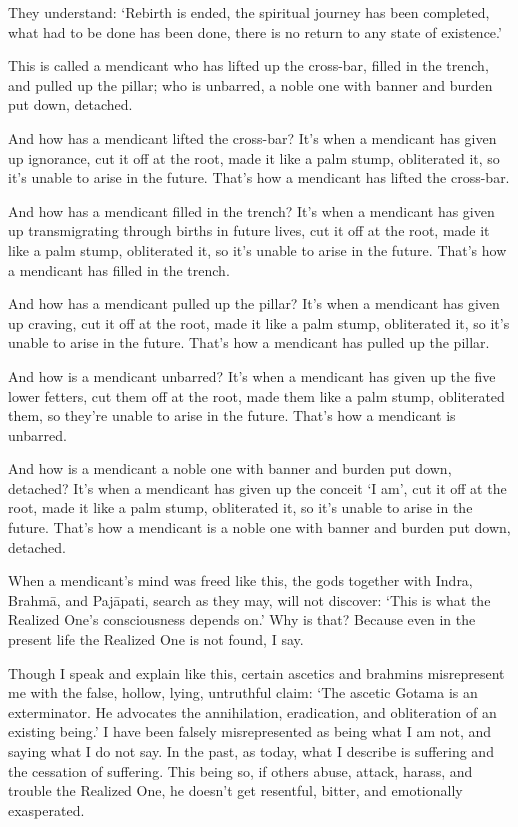 \documentclass[12pt,openany]{book}%
\begin{document}
They understand: ‘Rebirth is ended, the spiritual journey has been completed, what had to be done has been done, there is no return to any state of existence.’ 

This is called a mendicant who has lifted up the cross-bar, filled in the trench, and pulled up the pillar; who is unbarred, a noble one with banner and burden put down, detached. 

And how has a mendicant lifted the cross-bar? It’s when a mendicant has given up ignorance, cut it off at the root, made it like a palm stump, obliterated it, so it’s unable to arise in the future. That’s how a mendicant has lifted the cross-bar. 

And how has a mendicant filled in the trench? It’s when a mendicant has given up transmigrating through births in future lives, cut it off at the root, made it like a palm stump, obliterated it, so it’s unable to arise in the future. That’s how a mendicant has filled in the trench. 

And how has a mendicant pulled up the pillar? It’s when a mendicant has given up craving, cut it off at the root, made it like a palm stump, obliterated it, so it’s unable to arise in the future. That’s how a mendicant has pulled up the pillar. 

And how is a mendicant unbarred? It’s when a mendicant has given up the five lower fetters, cut them off at the root, made them like a palm stump, obliterated them, so they’re unable to arise in the future. That’s how a mendicant is unbarred. 

And how is a mendicant a noble one with banner and burden put down, detached? It’s when a mendicant has given up the conceit ‘I am’, cut it off at the root, made it like a palm stump, obliterated it, so it’s unable to arise in the future. That’s how a mendicant is a noble one with banner and burden put down, detached. 

When a mendicant’s mind was freed like this, the gods together with Indra, \textsanskrit{Brahmā}, and \textsanskrit{Pajāpati}, search as they may, will not discover: ‘This is what the Realized One’s consciousness depends on.’ Why is that? Because even in the present life the Realized One is not found, I say. 

Though I speak and explain like this, certain ascetics and brahmins misrepresent me with the false, hollow, lying, untruthful claim: ‘The ascetic Gotama is an exterminator. He advocates the annihilation, eradication, and obliteration of an existing being.’ I have been falsely misrepresented as being what I am not, and saying what I do not say. In the past, as today, what I describe is suffering and the cessation of suffering. This being so, if others abuse, attack, harass, and trouble the Realized One, he doesn’t get resentful, bitter, and emotionally exasperated. 
\end{document}
